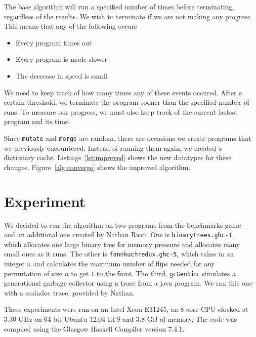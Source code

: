 \documentclass[preprint,nocopyrightspace]{sigplanconf}
\begin{document}
The base algorithm will run a specified number of times before terminating, regardless of the results. We wish to terminate if we are not making any progress. This means that any of the following occurs
\begin{itemize}
\item Every program times out
\item Every program is made slower
\item The decrease in speed is small
\end{itemize}
We need to keep track of how many times any of these events occured. After a certain threshold, we terminate the program sooner than the specified number of runs. To measure our progress, we must also keep track of the current fastest program and its time.

Since \lstinline!mutate! and \lstinline!merge! are random, there are occasions we create programs that we previously encountered. Instead of running them again, we created a dictionary cache. Listings~\ref{lst:improved} shows the new datatypes for these changes. Figure~\ref{alg:converge} shows the improved algorithm.
\section{Experiment}\label{sec:expr}
We decided to run the algorithm on two programs from the benchmarks game~\cite{bgames} and an additional one created by Nathan Ricci. One is \lstinline!binarytrees.ghc-1!, which allocates one large binary tree for memory pressure and allocates many small ones as it runs. The other is \lstinline!fannkuchredux.ghc-5!, which takes in an integer $n$ and calculates the maximum number of flips needed for any permutation of size $n$ to get $1$ to the front. The third, \lstinline!gcGenSim!, simulates a generational garbage collector using a trace from a java program. We ran this one with a scaladoc trace, provided by Nathan.

These experiments were run on an Intel Xeon E31245, an 8 core CPU clocked at 3.30 GHz on 64-bit Ubuntu 12.04 LTS and 3.8 GB of memory. The code was compiled using the Glasgow Haskell Compiler version 7.4.1.

\end{document}
